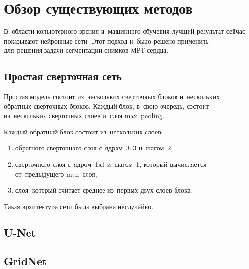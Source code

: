 \section{Обзор существующих методов}

В~области копьютерного зрения и~машинного обучения лучший результат сейчас показывают нейронные сети. Этот подход и~было решено применить для~решения задачи сегментации снимков МРТ сердца.

\subsection{Простая сверточная сеть}
 
Простая модель состоит из~нескольких сверточных блоков и~нескольких обратных сверточных блоков. Каждый блок, в~свою очередь, состоит из~нескольких сверточных слоев и~слоя max~pooling. 

Каждый обратный блок состоит из~нескольких слоев:

\begin{enumerate}
	\item обратного сверточного слоя с~ядром~3x3 и~шагом~2,
	\item сверточного слоя с~ядром~1х1 и~шагом~1, который вычисляется от~предыдущего mvn~слоя,
	\item слоя, который считает среднее из~первых двух слоев блока.
\end{enumerate}

Такая архитектура сети была выбрана неслучайно.


\subsection{U-Net}

\subsection{GridNet}
